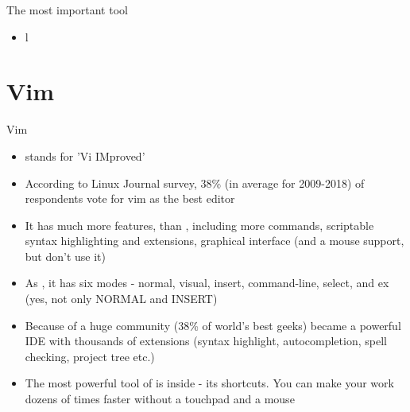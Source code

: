\documentclass[usenames,dvipsnames,10pt,aspectratio=169]{beamer}
\begin{document}
\begin{frame}{The most important tool}
    \begin{itemize}
        \item l
    \end{itemize}
\end{frame}

\section{Vim}

\begin{frame}{Vim}
    \begin{itemize}
        \item {} stands for 'Vi IMproved'
        \item According to Linux Journal survey, 38\% (in average for 2009-2018) of respondents vote for vim as the best editor
        \item It has much more features, than , including more commands, scriptable syntax highlighting and extensions, graphical interface (and a mouse support, but don't use it)
        \item As , it has six modes - normal, visual, insert, command-line, select, and ex (yes, not only NORMAL and INSERT)
        \item Because of a huge community (38\% of world's best geeks)  became a powerful IDE with thousands of extensions (syntax highlight, autocompletion, spell checking, project tree etc.)
        \item The most powerful tool of  is inside - its shortcuts. You can make your work dozens of times faster without a touchpad and a mouse
    \end{itemize}
\end{frame}
\end{document}
